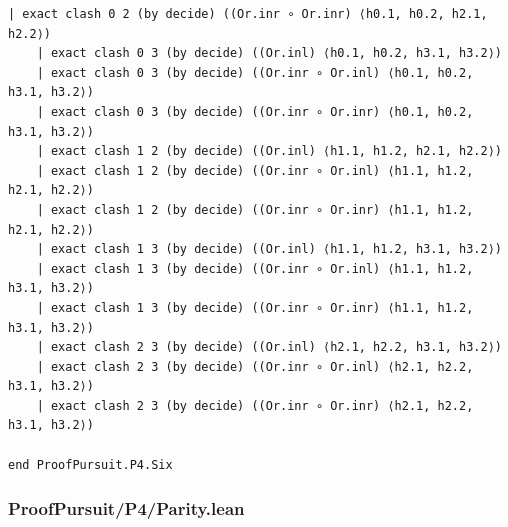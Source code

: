\documentclass[11pt,a4paper]{article}
\begin{document}
\begin{Verbatim}[breaklines,breakanywhere,fontsize=\footnotesize]
    | exact clash 0 2 (by decide) ((Or.inr ∘ Or.inr) ⟨h0.1, h0.2, h2.1, h2.2⟩)
    | exact clash 0 3 (by decide) ((Or.inl) ⟨h0.1, h0.2, h3.1, h3.2⟩)
    | exact clash 0 3 (by decide) ((Or.inr ∘ Or.inl) ⟨h0.1, h0.2, h3.1, h3.2⟩)
    | exact clash 0 3 (by decide) ((Or.inr ∘ Or.inr) ⟨h0.1, h0.2, h3.1, h3.2⟩)
    | exact clash 1 2 (by decide) ((Or.inl) ⟨h1.1, h1.2, h2.1, h2.2⟩)
    | exact clash 1 2 (by decide) ((Or.inr ∘ Or.inl) ⟨h1.1, h1.2, h2.1, h2.2⟩)
    | exact clash 1 2 (by decide) ((Or.inr ∘ Or.inr) ⟨h1.1, h1.2, h2.1, h2.2⟩)
    | exact clash 1 3 (by decide) ((Or.inl) ⟨h1.1, h1.2, h3.1, h3.2⟩)
    | exact clash 1 3 (by decide) ((Or.inr ∘ Or.inl) ⟨h1.1, h1.2, h3.1, h3.2⟩)
    | exact clash 1 3 (by decide) ((Or.inr ∘ Or.inr) ⟨h1.1, h1.2, h3.1, h3.2⟩)
    | exact clash 2 3 (by decide) ((Or.inl) ⟨h2.1, h2.2, h3.1, h3.2⟩)
    | exact clash 2 3 (by decide) ((Or.inr ∘ Or.inl) ⟨h2.1, h2.2, h3.1, h3.2⟩)
    | exact clash 2 3 (by decide) ((Or.inr ∘ Or.inr) ⟨h2.1, h2.2, h3.1, h3.2⟩)

end ProofPursuit.P4.Six
\end{Verbatim}

\subsubsection{ProofPursuit/P4/Parity.lean}\label{proofpursuitp4parity.lean}
\end{document}
